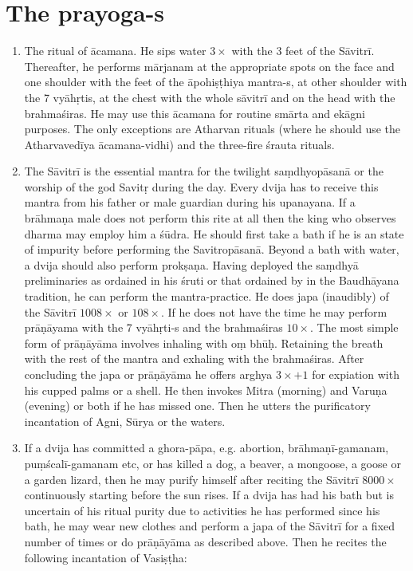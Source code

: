 \documentclass[12pt]{article}
\begin{document}
\section{The prayoga-s}
 \begin{enumerate}
\item The ritual of ācamana. He sips water $3\times$ with the 3 feet of the Sāvitrī. Thereafter, he performs mārjanam at the appropriate spots on the face and one shoulder with the feet of the āpohiṣṭhiya mantra-s, at other shoulder with the 7 vyāhṛtis, at the chest with the whole sāvitrī and on the head with the brahmaśiras. He may use this ācamana for routine smārta and ekāgni purposes. The only exceptions are Atharvan rituals (where he should use the Atharvavedīya ācamana-vidhi) and the three-fire śrauta rituals.
\item The Sāvitrī is the essential mantra for the twilight saṃdhyopāsanā or the worship of the god Savitṛ during the day. Every dvija has to receive this mantra from his father or male guardian during his upanayana. If a brāhmaṇa male does not perform this rite at all then the king who observes dharma may employ him a śūdra. He should first take a bath if he is an state of impurity before performing the Savitropāsanā. Beyond a bath with water, a dvija should also perform prokṣaṇa. Having deployed the saṃdhyā preliminaries as ordained in his śruti or that ordained by in the Baudhāyana tradition, he can perform the mantra-practice. He does japa (inaudibly) of the Sāvitrī $1008 \times$ or $108 \times$. If he does not have the time he may perform prāṇāyama with the 7 vyāhṛti-s and the brahmaśiras $10 \times$. The most simple form of prāṇāyāma involves inhaling with oṃ bhūḥ. Retaining the breath with the rest of the mantra and exhaling with the brahmaśiras. After concluding the japa or prāṇāyāma he offers arghya $3\times +1$ for expiation with his cupped palms or a shell. He then invokes Mitra (morning) and Varuṇa (evening) or both if he has missed one. Then he utters the purificatory incantation of Agni, Sūrya or the waters.
\item If a dvija has committed a ghora-pāpa, e.g. abortion, brāhmaṇī-gamanam, puṃścalī-gamanam etc, or has killed a dog, a beaver, a mongoose, a goose or a garden lizard, then he may purify himself after reciting the Sāvitrī $8000\times$ continuously starting before the sun rises. If a dvija has had his bath but is uncertain of his ritual purity due to activities he has performed since his bath, he may wear new clothes and perform a japa of the Sāvitrī for a fixed number of times or do prāṇāyāma as described above. Then he recites the following incantation of Vasiṣṭha:\\[8pt]

\end{enumerate}
\end{document}
